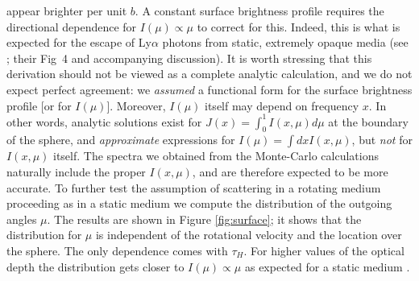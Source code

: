 appear brighter per unit $b$.
A constant surface brightness profile requires the directional
dependence for $I(\mu) \propto \mu$ to correct for this.
Indeed, this is what is expected for the escape of Ly$\alpha$ photons
from static, extremely opaque media (see \citet{Ahn01}; their
Fig~4 and accompanying discussion).
It is worth stressing that this derivation should not be viewed as a
complete analytic calculation, and we do not expect perfect agreement:
we {\it assumed} a functional form for the surface brightness profile
[or for $I(\mu)$]. Moreover, $I(\mu)$ itself may depend on frequency $x$. In other words, analytic solutions exist for $J(x) =
\int_0^1 I(x,\mu) d\mu$ at the boundary of the sphere, and {\it approximate}
expressions for $I(\mu) =\int dx I(x,\mu)$, but {\it not} for $I(x,\mu)$
itself. The spectra we obtained from the Monte-Carlo calculations naturally include the proper $I(x,\mu)$, and are therefore expected to be more accurate.
To further test the assumption of scattering in a rotating medium proceeding
as in a static medium we compute the distribution of the outgoing
angles $\mu$. The results are shown in Figure \ref{fig:surface}; it
shows that the distribution for $\mu$ is independent of the rotational
velocity and the location over the sphere. The only dependence comes
with $\tau_{H}$. For higher values of the optical depth the
distribution gets closer to $I(\mu)\propto \mu$ as expected for a
static medium \citep{Ahn01}.
%
